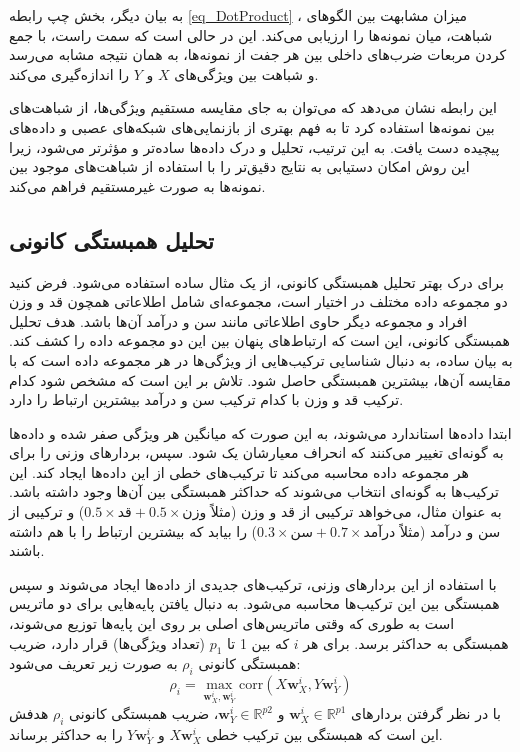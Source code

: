 به بیان دیگر، بخش چپ رابطه
\eqref{eq_DotProduct}%
، میزان مشابهت بین الگوهای شباهت، میان نمونه‌ها را ارزیابی می‌کند. این در حالی است که سمت راست، با جمع کردن مربعات ضرب‌های داخلی بین هر جفت از نمونه‌ها، به همان نتیجه مشابه می‌رسد و شباهت بین ویژگی‌های \(X\) و \(Y\) را اندازه‌گیری می‌کند.

این رابطه نشان می‌دهد که می‌توان به جای مقایسه مستقیم ویژگی‌ها، از شباهت‌های بین نمونه‌ها استفاده کرد تا به فهم بهتری از بازنمایی‌های شبکه‌های عصبی و داده‌های پیچیده دست یافت. به این ترتیب، تحلیل و درک داده‌ها ساده‌تر و مؤثرتر می‌شود، زیرا این روش امکان دستیابی به نتایج دقیق‌تر را با استفاده از شباهت‌های موجود بین نمونه‌ها به صورت غیرمستقیم فراهم می‌کند.



\subsection{
	تحلیل همبستگی کانونی%
}
برای درک بهتر تحلیل همبستگی کانونی، از یک مثال ساده استفاده می‌شود. فرض کنید دو مجموعه داده مختلف در اختیار است، مجموعه‌ای شامل اطلاعاتی همچون قد و وزن افراد و مجموعه دیگر حاوی اطلاعاتی مانند سن و درآمد آن‌ها باشد. هدف تحلیل همبستگی کانونی، این است که ارتباط‌های پنهان بین این دو مجموعه داده را کشف کند. به بیان ساده،
به دنبال شناسایی ترکیب‌هایی از ویژگی‌ها در هر مجموعه داده است که با مقایسه آن‌ها، بیشترین همبستگی حاصل شود. تلاش بر این است که مشخص شود کدام ترکیب قد و وزن با کدام ترکیب سن و درآمد بیشترین ارتباط را دارد.

ابتدا داده‌ها استاندارد می‌شوند، به این صورت که میانگین هر ویژگی صفر شده و داده‌ها به گونه‌ای تغییر می‌کنند که انحراف معیارشان یک شود. سپس،
بردارهای وزنی را برای هر مجموعه داده محاسبه می‌کند تا ترکیب‌های خطی از این داده‌ها ایجاد کند. این ترکیب‌ها به گونه‌ای انتخاب می‌شوند که حداکثر همبستگی بین آن‌ها وجود داشته باشد. به عنوان مثال،
می‌خواهد ترکیبی از قد و وزن (مثلاً \(0.5 \times \text{قد} + 0.5 \times \text{وزن}\)) و ترکیبی از سن و درآمد (مثلاً \(0.3 \times \text{سن} + 0.7 \times \text{درآمد}\)) را بیابد که بیشترین ارتباط را با هم داشته باشند.

با استفاده از این بردارهای وزنی، ترکیب‌های جدیدی از داده‌ها ایجاد می‌شوند و سپس همبستگی بین این ترکیب‌ها محاسبه می‌شود.
به دنبال یافتن پایه‌هایی برای دو ماتریس است به طوری که وقتی ماتریس‌های اصلی بر روی این پایه‌ها توزیع می‌شوند، همبستگی به حداکثر برسد. برای هر \(i\) که بین 1 تا \(p_1\) (تعداد ویژگی‌ها) قرار دارد، ضریب همبستگی کانونی \( \rho_i \) به صورت زیر تعریف می‌شود: 
\begin{equation}
	\rho_i = \max_{\mathbf{w}_X^i, \mathbf{w}_Y^i} \text{corr}(X \mathbf{w}_X^i, Y \mathbf{w}_Y^i)
\end{equation}
با در نظر گرفتن بردارهای \(\mathbf{w}_X^i \in \mathbb{R}^{p1}\) و \(\mathbf{w}_Y^i \in \mathbb{R}^{p2}\)، ضریب همبستگی کانونی \( \rho_i \) هدفش این است که همبستگی بین ترکیب خطی \( X \mathbf{w}_X^i \) و \( Y \mathbf{w}_Y^i \) را به حداکثر برساند.

